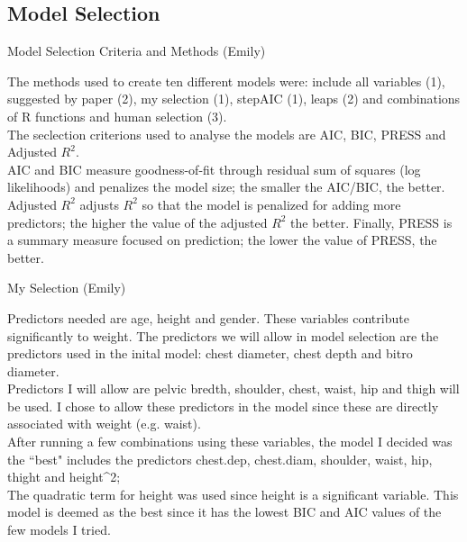\documentclass[table]{beamer}\usepackage[]{graphicx}\usepackage[]{color}
\begin{document}

\subsection{Model Selection}

\begin{frame}{Model Selection Criteria and Methods (Emily)}

{\fontsize{0.275cm}{1em}\selectfont
The methods used to create ten different models were: include all variables (1), suggested by paper (2), my selection (1), stepAIC (1), leaps (2) and combinations of R functions and human selection (3).  \\
The seclection criterions used to analyse the models are AIC, BIC, PRESS and Adjusted $R^2$. \\
AIC and BIC measure goodness-of-fit through residual sum of squares (log likelihoods) and penalizes the model size; the smaller the AIC/BIC, the better. Adjusted $R^2$ adjusts $R^2$ so that the model is penalized for adding more predictors; the higher the value of the adjusted $R^2$ the better. Finally, PRESS is a summary measure focused on prediction; the lower the value of PRESS, the better.
}

\end{frame}

\begin{frame}{My Selection (Emily)}


Predictors needed are age, height and gender. These variables contribute significantly to weight. The predictors we will allow in model selection are the predictors used in the inital model: chest diameter, chest depth and bitro diameter.\\
Predictors I will allow are pelvic bredth, shoulder, chest, waist, hip and thigh will be used. I chose to allow these predictors in the model since these are directly associated with weight (e.g. waist). \\
After running a few combinations using these variables, the model I decided was the ``best" includes the predictors chest.dep, chest.diam, shoulder, waist, hip, thight and height^2;\\
The quadratic term for height was used since height is a significant variable. This model is deemed as the best since it has the lowest BIC and AIC values of the few models I tried.

\end{frame}
\end{document}
